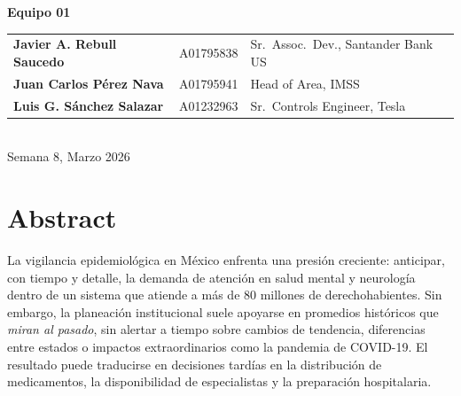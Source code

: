 \documentclass[12pt, letterpaper]{article}
\begin{document}
\begin{titlepage}
\begin{center}
\textbf{\Large Equipo 01}\\[0.4cm]
\begin{tabular}{lll}
\textbf{Javier A. Rebull Saucedo} & A01795838 & Sr.\ Assoc.\ Dev., Santander Bank US \\
\textbf{Juan Carlos Pérez Nava}   & A01795941 & Head of Area, IMSS \\
\textbf{Luis G. Sánchez Salazar}  & A01232963 & Sr.\ Controls Engineer, Tesla \\
\end{tabular}\\[1.0cm]

{\large Semana 8, Marzo 2026}

\end{center}
\end{titlepage}

\newpage
\tableofcontents
\newpage
\listoffigures
\listoftables
\newpage


\newpage
\section*{Abstract}\label{sec:abstract}

La vigilancia epidemiológica en México enfrenta una presión creciente: anticipar, con tiempo y detalle, la demanda de atención en salud mental y neurología dentro de un sistema que atiende a más de 80 millones de derechohabientes. Sin embargo, la planeación institucional suele apoyarse en promedios históricos que \emph{miran al pasado}, sin alertar a tiempo sobre cambios de tendencia, diferencias entre estados o impactos extraordinarios como la pandemia de COVID-19. El resultado puede traducirse en decisiones tardías en la distribución de medicamentos, la disponibilidad de especialistas y la preparación hospitalaria.
\end{document}
